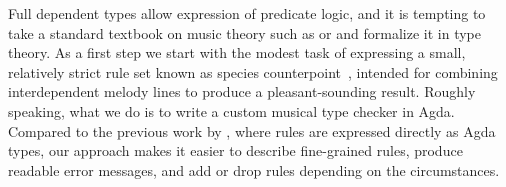 

Full dependent types allow expression of predicate logic, and it is
tempting to take a standard textbook on music theory such as
\citet{piston-harmony} or \citet{aldwell2018harmony} and formalize it
in type theory.  As a first step we start with the modest task of
expressing a small, relatively strict rule set known as species
counterpoint~\cite{fux-cp}, intended for combining interdependent
melody lines to produce a pleasant-sounding result.  Roughly speaking,
what we do is to write a custom musical type checker in Agda.
Compared to the previous work by \citet{cong-cp}, where rules are
expressed directly as Agda types, our approach makes it easier to
describe fine-grained rules, produce readable error messages, and add
or drop rules depending on the circumstances.



